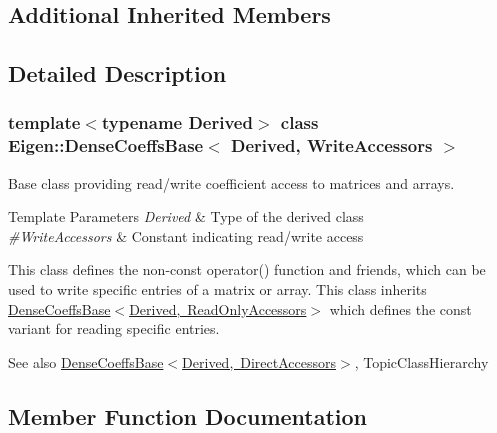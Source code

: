 \subsection*{Additional Inherited Members}


\subsection{Detailed Description}
\subsubsection*{template$<$typename Derived$>$\newline
class Eigen\+::\+Dense\+Coeffs\+Base$<$ Derived, Write\+Accessors $>$}

Base class providing read/write coefficient access to matrices and arrays. 


\begin{DoxyTemplParams}{Template Parameters}
{\em Derived} & Type of the derived class \\
\hline
{\em \#\+Write\+Accessors} & Constant indicating read/write access\\
\hline
\end{DoxyTemplParams}
This class defines the non-\/const {\ttfamily operator()} function and friends, which can be used to write specific entries of a matrix or array. This class inherits \mbox{\hyperlink{class_eigen_1_1_dense_coeffs_base_3_01_derived_00_01_read_only_accessors_01_4}{Dense\+Coeffs\+Base$<$\+Derived, Read\+Only\+Accessors$>$}} which defines the const variant for reading specific entries.

\begin{DoxySeeAlso}{See also}
\mbox{\hyperlink{class_eigen_1_1_dense_coeffs_base_3_01_derived_00_01_direct_accessors_01_4}{Dense\+Coeffs\+Base$<$\+Derived, Direct\+Accessors$>$}}, Topic\+Class\+Hierarchy 
\end{DoxySeeAlso}


\subsection{Member Function Documentation}
\mbox{\label{class_eigen_1_1_dense_coeffs_base_3_01_derived_00_01_write_accessors_01_4_adf14e9563a1d2a39a6fee334dfcfb105}} 
